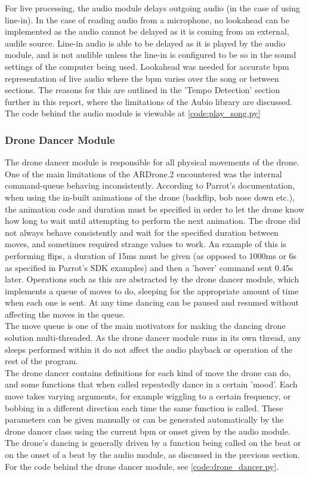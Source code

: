 For live processing, the audio module delays outgoing audio (in the case of using line-in). In the case of
reading audio from a microphone, no lookahead can be implemented as the audio cannot be delayed as it is coming
from an external, audile source. Line-in audio is able to be delayed as it is played by the audio module, and is
not audible unless the line-in is configured to be so in the sound settings of the computer being used. Lookahead
was needed for accurate bpm representation of live audio where the bpm varies over the song or between sections.
The reasons for this are outlined in the 'Tempo Detection' section further in this report, where the limitations
of the Aubio library are discussed. The code behind the audio module is viewable at \eqref{code:play_song.py}\\

\subsubsection{Drone Dancer Module}
The drone dancer module is responsible for all physical movements of the drone. One of the main limitations of
the ARDrone.2 encountered was the internal command-queue behaving inconsistently. According to Parrot's
documentation, when using the in-built animations of the drone (backflip, bob nose down etc.), the animation code
and duration must be specified in order to let the drone know how long to wait until attempting to perform the
next animation. The drone did not always behave consistently and wait for the specified duration between moves,
and sometimes required strange values to work. An example of this is performing flips, a duration of 15ms must be
given (as opposed to 1000ms or 6s as specified in Parrot's SDK examples) and then a 'hover' command sent 0.45s
later. Operations such as this are abstracted by the drone dancer module, which implements a queue of moves to
do, sleeping for the appropriate amount of time when each one is sent. At any time dancing can be paused and
resumed without affecting the moves in the queue.\\

The move queue is one of the main motivators for making the dancing drone solution multi-threaded. As the drone
dancer module runs in its own thread, any sleeps performed within it do not affect the audio playback or
operation of the rest of the program.\\

The drone dancer contains definitions for each kind of move the drone can do, and some functions that when called
repeatedly dance in a certain 'mood'. Each move takes varying arguments, for example wiggling to a certain
frequency, or bobbing in a different direction each time the same function is called. These parameters can be
given manually or can be generated automatically by the drone dancer class using the current bpm or onset given by the
audio module. The drone's dancing is generally driven by a function being called on the beat or on the onset of a
beat by the audio module, as discussed in the previous section. For the code behind the drone dancer module, see
\eqref{code:drone_dancer.py}.\\

